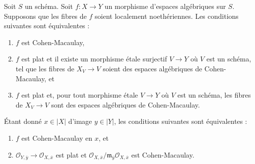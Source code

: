 \begin{lemma}
\label{lemma-CM}
Soit $S$ un schéma. Soit $f : X \to Y$ un morphisme d'espaces algébriques
sur $S$. Supposons que les fibres de $f$ soient localement noethériennes.
Les conditions suivantes sont équivalentes :
\begin{enumerate}
\item $f$ est Cohen-Macaulay,
\item $f$ est plat et il existe un morphisme étale surjectif $V \to Y$
où $V$ est un schéma, tel que les fibres de $X_V \to V$
soient des espaces algébriques de Cohen-Macaulay, et
\item $f$ est plat et, pour tout morphisme étale $V \to Y$
où $V$ est un schéma, les fibres de $X_V \to V$
sont des espaces algébriques de Cohen-Macaulay.
\end{enumerate}
Étant donné $x \in |X|$ d'image $y \in |Y|$, les conditions suivantes sont
équivalentes :
\begin{enumerate}
\item[(a)] $f$ est Cohen-Macaulay en $x$, et
\item[(b)] $\mathcal{O}_{Y, \overline{y}} \to \mathcal{O}_{X, \overline{x}}$
est plat et
$\mathcal{O}_{X, \overline{x}}/
\mathfrak m_{\overline{y}}\mathcal{O}_{X, \overline{x}}$ est Cohen-Macaulay.
\end{enumerate}
\end{lemma}

